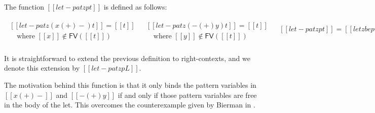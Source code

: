 \begin{definition}
  \label{def:let-pat-term}
  The function $[[let-pat z p t]]$ is defined as follows:
  \begin{center}
    \begin{math}
      \begin{array}{lll}      
        \begin{array}{lll}
          [[let-pat z (x (+) -) t]] = [[t]]\\
          \,\,\,\,\,\,\text{where } [[x]] \not\in \mathsf{FV}([[t]])\\
        \end{array}
        & 
          \begin{array}{lll}
            [[let-pat z (- (+) y) t]] = [[t]]\\
        \,\,\,\,\,\,\text{where } [[y]] \not\in \mathsf{FV}([[t]])\\
          \end{array}
        & 
          \begin{array}{lll}
            [[let-pat z p t]] = [[let z be p in t]]\\
            & \\
          \end{array}
      \end{array}
    \end{math}
  \end{center}
  It is straightforward to extend the previous definition to
  right-contexts, and we denote this extension by $[[let-pat z p L]]$.
\end{definition}
The motivation behind this function is that it only binds the pattern
variables in $[[x (+) -]]$ and $[[- (+) y]]$ if and only if those
pattern variables are free in the body of the let.  This overcomes the
counterexample given by Bierman in \cite{Bierman:1996}.  

